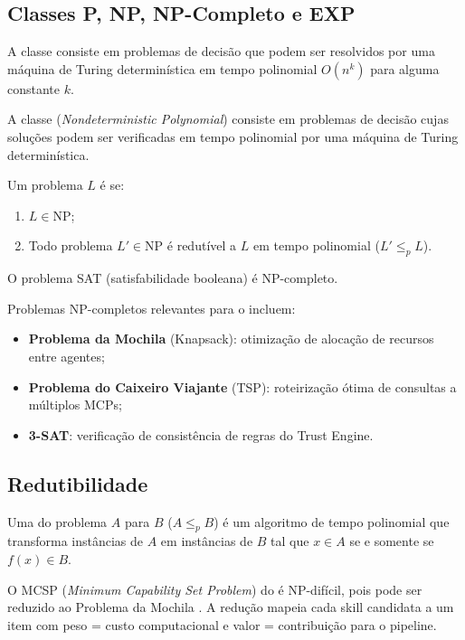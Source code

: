\subsection{Classes P, NP, NP-Completo e EXP}
\begin{definicao}[Classe P]
A classe  consiste em problemas de decisão que podem ser
resolvidos por uma máquina de Turing determinística em tempo polinomial
$O(n^k)$ para alguma constante $k$.
\end{definicao}
\begin{definicao}[Classe NP]
A classe  (\textit{Nondeterministic Polynomial}) consiste
em problemas de decisão cujas soluções podem ser verificadas em tempo
polinomial por uma máquina de Turing determinística.
\end{definicao}
\begin{definicao}[NP-completude]
Um problema $L$ é  se:
\begin{enumerate}
\item $L \in \text{NP}$;
\item Todo problema $L' \in \text{NP}$ é redutível a $L$ em tempo
polinomial ($L' \leq_p L$).
\end{enumerate}
\end{definicao}
\begin{teorema}
O problema SAT (satisfabilidade booleana) é NP-completo.
\end{teorema}
\begin{exemplo}
Problemas NP-completos relevantes para o \opencodeeco{} incluem:
\begin{itemize}
\item \textbf{Problema da Mochila} (Knapsack): otimização de alocação
de recursos entre agentes;
\item \textbf{Problema do Caixeiro Viajante} (TSP): roteirização
ótima de consultas a múltiplos MCPs;
\item \textbf{3-SAT}: verificação de consistência de regras do
Trust Engine.
\end{itemize}
\end{exemplo}
\subsection{Redutibilidade}
\begin{definicao}
Uma  do problema $A$ para $B$
($A \leq_p B$) é um algoritmo de tempo polinomial que transforma
instâncias de $A$ em instâncias de $B$ tal que $x \in A$ se e somente
se $f(x) \in B$.
\end{definicao}
\begin{exemplo}
O MCSP (\textit{Minimum Capability Set Problem}) do \opencodeeco{} é
NP-difícil, pois pode ser reduzido ao Problema da Mochila
\cite{opencode2026scanner}. A redução mapeia cada skill candidata a um
item com peso = custo computacional e valor = contribuição para o
pipeline.
\end{exemplo}
